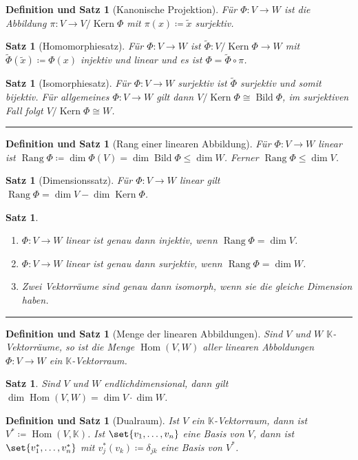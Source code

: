 \documentclass[a4paper]{article}
\newcounter{Sec}
\theoremstyle{marginbreak}
\newtheorem{satz}[definition]{Satz}
\newtheorem{defsatz}[definition]{Definition und Satz}
\DeclareMathOperator{\Kern}{Kern}
\DeclareMathOperator{\Bild}{Bild}
\DeclareMathOperator{\Rang}{Rang}
\DeclareMathOperator{\Hom}{Hom}
\newcommand{\sep}{%
	\rule{\textwidth}{0.3pt}%
	\stepcounter{Sec}%
	}
\begin{document}
	\begin{defsatz}[Kanonische Projektion]
		Für $\Phi\colon V\to W$ ist die Abbildung $\pi\colon V\to V/\Kern\Phi$ mit
		$\pi(x)\coloneqq\tilde{x}$ surjektiv.
	\end{defsatz}
	\begin{satz}[Homomorphiesatz]
		Für $\Phi\colon V\to W$ ist $\tilde{\Phi}\colon V/\Kern\Phi\to W$ mit
		$\tilde{\Phi}(\tilde{x})\coloneqq\Phi(x)$ injektiv und linear und es ist
		$\Phi = \tilde{\Phi}\circ\pi$.
	\end{satz}
	\begin{satz}[Isomorphiesatz]
		Für $\Phi\colon V\to W$ surjektiv ist $\tilde{\Phi}$ surjektiv und somit
		bijektiv. Für allgemeines $\Phi\colon V\to W$ gilt dann $V/\Kern\Phi\cong\Bild\Phi$,
		im surjektiven Fall folgt $V/\Kern\Phi\cong W$.
	\end{satz}
	\sep
	\begin{defsatz}[Rang einer linearen Abbildung]
		Für $\Phi\colon V\to W$ linear ist $\Rang\Phi\coloneqq\dim\Phi(V)=\dim\Bild\Phi\leq\dim W$.
		Ferner $\Rang\Phi\leq\dim V$.
	\end{defsatz}
	\begin{satz}[Dimensionssatz]
		Für $\Phi\colon V\to W$ linear gilt $\Rang\Phi = \dim V - \dim\Kern\Phi$.
	\end{satz}
	\begin{satz}
		\begin{enumerate}[label=(\alph*)]
			\item $\Phi\colon V\to W$ linear ist genau dann injektiv, wenn $\Rang\Phi=\dim V$.
			\item $\Phi\colon V\to W$ linear ist genau dann surjektiv, wenn $\Rang\Phi=\dim W$.
			\item Zwei Vektorräume sind genau dann isomorph, wenn sie die gleiche Dimension haben.
		\end{enumerate}
	\end{satz}
	\sep
	\begin{defsatz}[Menge der linearen Abbildungen]
		Sind $V$ und $W$ $\mathbb{K}$-Vektorräume, so ist die Menge $\Hom(V, W)$ aller
		linearen Abboldungen $\Phi\colon V\to W$ ein $\mathbb{K}$-Vektorraum.
	\end{defsatz}
	\begin{satz}
		Sind $V$ und $W$ endlichdimensional, dann gilt $\dim\Hom(V, W) = \dim V\cdot\dim W$.
	\end{satz}
	\begin{defsatz}[Dualraum]
		Ist $V$ ein $\mathbb{K}$-Vektorraum, dann ist $V^*\coloneqq\Hom(V,\mathbb{K})$.
		Ist $\set{v_1,\ldots,v_n}$ eine Basis von $V$, dann ist $\set{v_1^*,\ldots,v_n^*}$
		mit $v_j^*(v_k)\coloneqq\delta_{jk}$ eine Basis von $V^*$.
	\end{defsatz}
\end{document}
